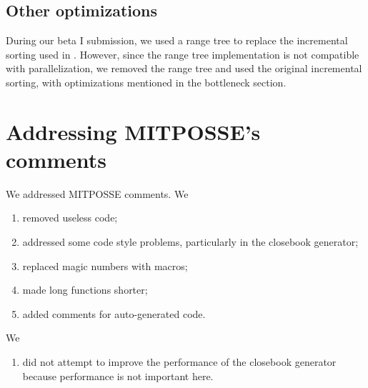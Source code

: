 \documentclass[10pt,twosidep]{article}
\begin{document}
\subsection{Other optimizations}
During our beta I submission, we used a range tree to replace the incremental sorting used in \scs. However, since the range tree implementation is not compatible with parallelization, we removed the range tree and used the original incremental sorting, with optimizations mentioned in the bottleneck section. 

\section{Addressing MITPOSSE's comments}

We addressed MITPOSSE comments. We 
\begin{enumerate}
	\item removed useless code;
	\item addressed some code style problems, particularly in the closebook generator;
	\item replaced magic numbers with macros;
	\item made long functions shorter;
	\item added comments for auto-generated code.
\end{enumerate}

We
\begin{enumerate}
	\item did not attempt to improve the performance of the closebook generator because performance is not important here.
\end{enumerate}
\end{document}
